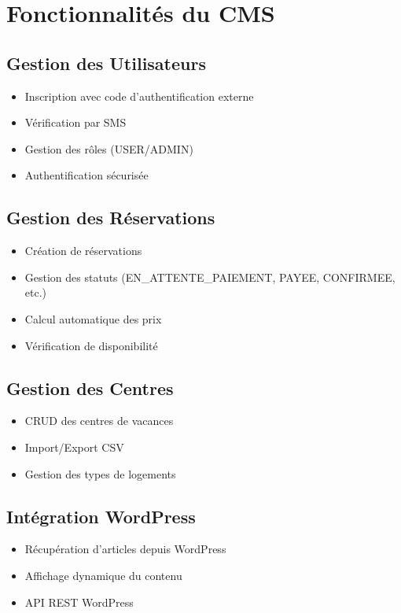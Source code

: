 \documentclass[12pt,a4paper]{article}
\begin{document}
\section{Fonctionnalités du CMS}

\subsection{Gestion des Utilisateurs}
\begin{itemize}
    \item Inscription avec code d'authentification externe
    \item Vérification par SMS
    \item Gestion des rôles (USER/ADMIN)
    \item Authentification sécurisée
\end{itemize}

\subsection{Gestion des Réservations}
\begin{itemize}
    \item Création de réservations
    \item Gestion des statuts (EN\_ATTENTE\_PAIEMENT, PAYEE, CONFIRMEE, etc.)
    \item Calcul automatique des prix
    \item Vérification de disponibilité
\end{itemize}

\subsection{Gestion des Centres}
\begin{itemize}
    \item CRUD des centres de vacances
    \item Import/Export CSV
    \item Gestion des types de logements
\end{itemize}

\subsection{Intégration WordPress}
\begin{itemize}
    \item Récupération d'articles depuis WordPress
    \item Affichage dynamique du contenu
    \item API REST WordPress
\end{itemize}
\end{document}
